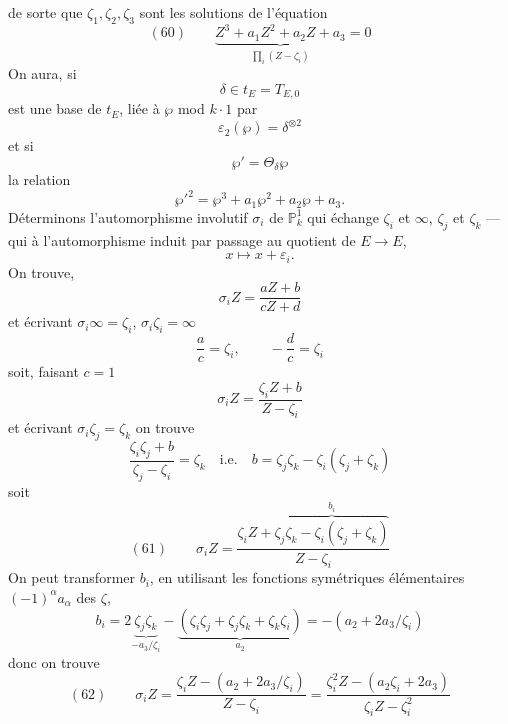 \documentclass[11pt,a4paper]{article}
\begin{document}
de sorte que $\zeta_1, \zeta_2, \zeta_3$ sont les solutions de l'équation
\[
  (60) \qquad \underbrace{Z^3 + a_1 Z^2 + a_2 Z + a_3}_{\prod_i (Z - \zeta_i)} = 0
\]
\struck{\ill{}}
On aura,  si
\[
  \delta \in t_E = T_{E,0}
\]
est une base de $t_E$, liée à $\wp$ mod $k \cdot 1$ par
\[
  \varepsilon_2(\wp) = \delta^{\otimes 2}
\]
et si
\[
  \wp' = \Theta_\delta \wp
\]
la relation
\[
  \wp'^2 = \wp^3 + a_1 \wp^2 + a_2 \wp + a_3 .
\]
Déterminons l'automorphisme involutif $\sigma_i$ de $\mathbb{P}^1_k$ qui échange
$\zeta_i$ et $\infty$, $\zeta_j$ et $\zeta_k$ --- qui \struck{\ill{}}
 à l'automorphisme induit par passage au quotient de
$E \to E$, 
\[
  x \longmapsto x + \varepsilon_i .
\]
On trouve, \struck{\ill{}}
\[
  \sigma_i Z = \frac{aZ + b}{cZ + d}
\]
et écrivant $\sigma_i \infty = \zeta_i$, $\sigma_i \zeta_i = \infty$
\[
  \frac{a}{c} = \zeta_i , \qquad -\frac{d}{c} = \zeta_i
\]
soit, faisant $c = 1$
\[
  \sigma_i Z = \frac{\zeta_i Z + b}{Z - \zeta_i}
\]
et écrivant $\sigma_i \zeta_j = \zeta_k$ on trouve
\[
  \frac{\zeta_i \zeta_j + b}{\zeta_j - \zeta_i} = \zeta_k
  \quad\text{i.e.}\quad b = \zeta_j \zeta_k - \zeta_i(\zeta_j + \zeta_k)
\]
soit
\[
  (61) \qquad \sigma_i Z = \frac{\zeta_i Z +
  \overbrace{\zeta_j \zeta_k - \zeta_i(\zeta_j + \zeta_k)}^{b_i}}{Z - \zeta_i}
\]
On peut transformer $b_i$, en utilisant les fonctions symétriques élémentaires
$(-1)^\alpha a_\alpha$ des $\zeta$,
\[
  b_i = 2\underbrace{\zeta_j \zeta_k}_{-a_3/\zeta_i} -
  \underbrace{(\zeta_i \zeta_j + \zeta_j \zeta_k + \zeta_k \zeta_i)}_{a_2}
  = -(a_2 + 2a_3/\zeta_i)
\]
 donc on trouve
\[
  (62) \qquad \sigma_i Z = \frac{\zeta_i Z - (a_2 + 2a_3/\zeta_i)}{Z - \zeta_i}
  = \frac{\zeta_i^2 Z - (a_2 \zeta_i + 2a_3)}{\zeta_i Z - \zeta_i^2}
\]
\end{document}
